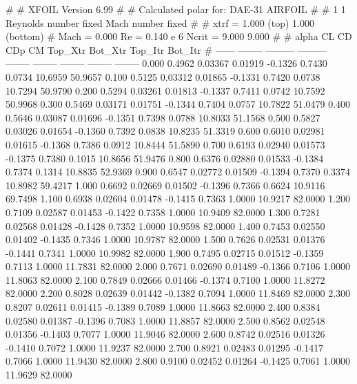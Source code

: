 #  
#       XFOIL         Version 6.99
#  
# Calculated polar for: DAE-31 AIRFOIL                                  
#  
# 1 1 Reynolds number fixed          Mach number fixed         
#  
# xtrf =   1.000 (top)        1.000 (bottom)  
# Mach =   0.000     Re =     0.140 e 6     Ncrit =   9.000  9.000
#  
#   alpha    CL        CD       CDp       CM     Top_Xtr  Bot_Xtr  Top_Itr  Bot_Itr
#  ------ -------- --------- --------- -------- -------- -------- -------- --------
   0.000   0.4962   0.03367   0.01919  -0.1326   0.7430   0.0734  10.6959  50.9657
   0.100   0.5125   0.03312   0.01865  -0.1331   0.7420   0.0738  10.7294  50.9790
   0.200   0.5294   0.03261   0.01813  -0.1337   0.7411   0.0742  10.7592  50.9968
   0.300   0.5469   0.03171   0.01751  -0.1344   0.7404   0.0757  10.7822  51.0479
   0.400   0.5646   0.03087   0.01696  -0.1351   0.7398   0.0788  10.8033  51.1568
   0.500   0.5827   0.03026   0.01654  -0.1360   0.7392   0.0838  10.8235  51.3319
   0.600   0.6010   0.02981   0.01615  -0.1368   0.7386   0.0912  10.8444  51.5890
   0.700   0.6193   0.02940   0.01573  -0.1375   0.7380   0.1015  10.8656  51.9476
   0.800   0.6376   0.02880   0.01533  -0.1384   0.7374   0.1314  10.8835  52.9369
   0.900   0.6547   0.02772   0.01509  -0.1394   0.7370   0.3374  10.8982  59.4217
   1.000   0.6692   0.02669   0.01502  -0.1396   0.7366   0.6624  10.9116  69.7498
   1.100   0.6938   0.02604   0.01478  -0.1415   0.7363   1.0000  10.9217  82.0000
   1.200   0.7109   0.02587   0.01453  -0.1422   0.7358   1.0000  10.9409  82.0000
   1.300   0.7281   0.02568   0.01428  -0.1428   0.7352   1.0000  10.9598  82.0000
   1.400   0.7453   0.02550   0.01402  -0.1435   0.7346   1.0000  10.9787  82.0000
   1.500   0.7626   0.02531   0.01376  -0.1441   0.7341   1.0000  10.9982  82.0000
   1.900   0.7495   0.02715   0.01512  -0.1359   0.7113   1.0000  11.7831  82.0000
   2.000   0.7671   0.02690   0.01489  -0.1366   0.7106   1.0000  11.8063  82.0000
   2.100   0.7849   0.02666   0.01466  -0.1374   0.7100   1.0000  11.8272  82.0000
   2.200   0.8028   0.02639   0.01442  -0.1382   0.7094   1.0000  11.8469  82.0000
   2.300   0.8207   0.02611   0.01415  -0.1389   0.7089   1.0000  11.8663  82.0000
   2.400   0.8384   0.02580   0.01387  -0.1396   0.7083   1.0000  11.8857  82.0000
   2.500   0.8562   0.02548   0.01356  -0.1403   0.7077   1.0000  11.9046  82.0000
   2.600   0.8742   0.02516   0.01326  -0.1410   0.7072   1.0000  11.9237  82.0000
   2.700   0.8921   0.02483   0.01295  -0.1417   0.7066   1.0000  11.9430  82.0000
   2.800   0.9100   0.02452   0.01264  -0.1425   0.7061   1.0000  11.9629  82.0000
